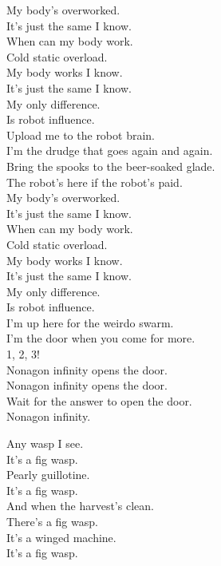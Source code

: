 My body's overworked. \\
It's just the same I know. \\
When can my body work. \\
Cold static overload. \\
My body works I know. \\
It's just the same I know. \\
My only difference. \\
Is robot influence. \\

Upload me to the robot brain. \\
I'm the drudge that goes again and again. \\

Bring the spooks to the beer-soaked glade. \\
The robot's here if the robot's paid. \\

My body's overworked. \\
It's just the same I know. \\
When can my body work. \\
Cold static overload. \\
My body works I know. \\
It's just the same I know. \\
My only difference. \\
Is robot influence. \\

I'm up here for the weirdo swarm. \\
I'm the door when you come for more. \\

1, 2, 3! \\

Nonagon infinity opens the door. \\
Nonagon infinity opens the door. \\
Wait for the answer to open the door. \\
Nonagon infinity. \\




Any wasp I see. \\
It's a fig wasp. \\
Pearly guillotine. \\
It's a fig wasp. \\
And when the harvest's clean. \\
There's a fig wasp. \\
It's a winged machine. \\
It's a fig wasp. \\

